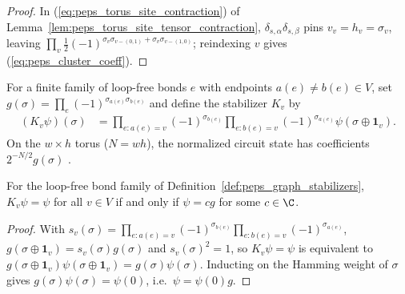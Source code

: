 \begin{proof}\leanok
    In (\ref{eq:peps_torus_site_contraction}) of
    Lemma~\ref{lem:peps_torus_site_tensor_contraction}, $\delta_{s,\alpha}\delta_{s,\beta}$
    pins $v_v=h_v=\sigma_v$, leaving
    $\prod_v\tfrac12(-1)^{\sigma_v\sigma_{v-(0,1)}+\sigma_v\sigma_{v-(1,0)}}$;
    reindexing $v$ gives (\ref{eq:peps_cluster_coeff}).
\end{proof}

\begin{definition}
    \label{def:peps_graph_stabilizers}
    \leanok
    For a finite family of loop-free bonds $e$ with endpoints $a(e)\neq b(e)\in V$,
    set $g(\sigma)=\prod_e(-1)^{\sigma_{a(e)}\sigma_{b(e)}}$ and define the
    stabilizer $K_v$ by
    \begin{align}
        (K_v\psi)(\sigma)
         & =\prod_{e:a(e)=v}(-1)^{\sigma_{b(e)}}
        \prod_{e:b(e)=v}(-1)^{\sigma_{a(e)}}
        \psi(\sigma\mathbin{\oplus}\mathbf{1}_v).
        \label{eq:peps_graph_stabilizer_def}
    \end{align}
    On the $w\times h$ torus ($N=wh$), the normalized circuit state has
    coefficients $2^{-N/2}g(\sigma)$
    \cite[Appendix~A, ``The cluster state'']{Cirac2021Matrix}.
\end{definition}

\begin{lemma}
    \label{thm:peps_graph_stabilizer_line}
    \leanok
    For the loop-free bond family of Definition~\ref{def:peps_graph_stabilizers},
    $K_v\psi=\psi$ for all $v\in V$ if and only if $\psi=cg$ for some $c\in\C$.
\end{lemma}

\begin{proof}\leanok
    With $s_v(\sigma)=\prod_{e:a(e)=v}(-1)^{\sigma_{b(e)}}\prod_{e:b(e)=v}(-1)^{\sigma_{a(e)}}$,
    $g(\sigma\oplus\mathbf{1}_v)=s_v(\sigma)g(\sigma)$ and $s_v(\sigma)^2=1$, so
    $K_v\psi=\psi$ is equivalent to
    $g(\sigma\oplus\mathbf{1}_v)\psi(\sigma\oplus\mathbf{1}_v)=g(\sigma)\psi(\sigma)$.
    Inducting on the Hamming weight of $\sigma$ gives
    $g(\sigma)\psi(\sigma)=\psi(0)$, i.e.\ $\psi=\psi(0)g$.
\end{proof}


